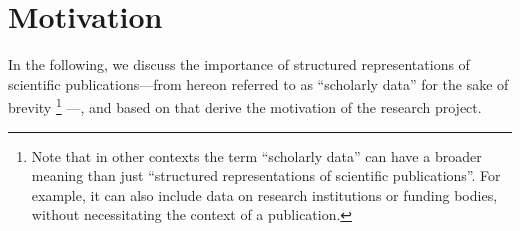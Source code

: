 

\section{Motivation}


In the following, we discuss the importance of structured representations of scientific publications---from hereon referred to as ``scholarly data'' for the sake of brevity%
\footnote{Note that in other contexts the term ``scholarly data'' can have a broader meaning than just ``structured representations of scientific publications''. For example, it can also include data on research institutions or funding bodies, without necessitating the context of a publication.}%
---, and based on that derive the motivation of the research project.




